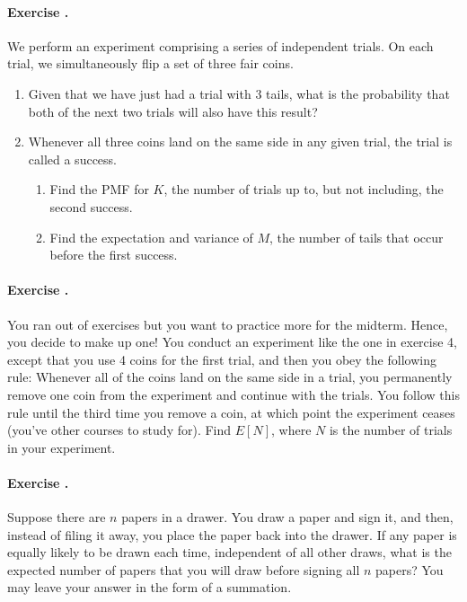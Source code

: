 \documentclass[twocolumn,12pt,a4paper]{article}
\newcounter{num}  %
\begin{document}
\paragraph{Exercise \thenum.}\label{ex:4}
We perform an experiment comprising a series of independent trials. On each trial, we simultaneously flip a set of three fair coins.

\begin{enumerate}
	\item Given that we have just had a trial with 3 tails, what is the probability that both of the next two trials will also have this result?
	
	\item Whenever all three coins land on the same side in any given trial, the trial is called a success.
	\begin{enumerate}
		\item Find the PMF for \( K \), the number of trials up to, but not including, the second success.
		
		\item Find the expectation and variance of \( M \), the number of tails that occur before the first success.
	\end{enumerate}
\end{enumerate}


\paragraph{Exercise \thenum.}
You ran out of exercises but you want to practice more for the midterm. Hence, you decide to make up one!
You conduct an experiment like the one in exercise 4, except that you use 4 coins for the first trial, and then you obey the following rule: Whenever all of the coins land on the same side in a trial, you permanently remove one coin from the experiment and continue with the trials. 
You follow this rule until the third time you remove a coin, at which point the experiment ceases (you've other courses to study for). 
Find \( E[N] \), where \( N \) is the number of trials in your experiment.


\paragraph{Exercise \thenum.}
Suppose there are \( n \) papers in a drawer. You draw a paper and sign it, and then, instead of filing it away, you place the paper back into the drawer. If any paper is equally likely to be drawn each time, independent of all other draws, what is the expected number of papers that you will draw before signing all \( n \) papers? You may leave your answer in the form of a summation.
\end{document}
